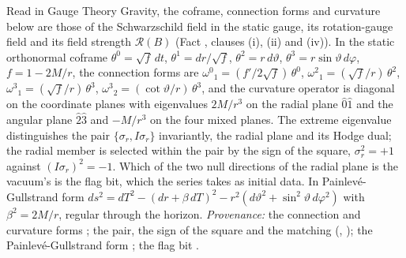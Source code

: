 Read in Gauge Theory Gravity, the coframe, connection forms and curvature below are those of the Schwarzschild field in the static gauge, its rotation-gauge field and its field strength $\mathcal{R}(B)$ (Fact , clauses (i), (ii) and (iv)). In the static orthonormal coframe $\theta^{0} = \sqrt f\,dt$, $\theta^{1} = dr/\sqrt f$, $\theta^{2} = r\,d\vartheta$, $\theta^{3} = r\sin\vartheta\,d\varphi$, $f = 1 - 2M/r$, the connection forms are $\omega^{0}{}_{1} = (f'/2\sqrt f)\,\theta^{0}$, $\omega^{2}{}_{1} = (\sqrt f/r)\,\theta^{2}$, $\omega^{3}{}_{1} = (\sqrt f/r)\,\theta^{3}$, $\omega^{3}{}_{2} = (\cot\vartheta/r)\,\theta^{3}$, and the curvature operator is diagonal on the coordinate planes with eigenvalues $2M/r^{3}$ on the radial plane $\hat0\hat1$ and the angular plane $\hat2\hat3$ and $-M/r^{3}$ on the four mixed planes. The extreme eigenvalue distinguishes the pair $\{\sigma_{r}, I\sigma_{r}\}$ invariantly, the radial plane and its Hodge dual; the radial member is selected within the pair by the sign of the square, $\sigma_{r}^{2} = +1$ against $(I\sigma_{r})^{2} = -1$. Which of the two null directions of the radial plane is the vacuum's is the flag bit, which the series takes as initial data. In Painlev\'e-Gullstrand form $ds^{2} = dT^{2} - (dr + \beta\,dT)^{2} - r^{2}(d\vartheta^{2} + \sin^{2}\vartheta\,d\varphi^{2})$ with $\beta^{2} = 2M/r$, regular through the horizon. \emph{Provenance:} the connection and curvature forms \cite[App.~A.2]{ButlerT5}; the pair, the sign of the square and the matching \cite[Thm.~6.1, Prop.~7.21(3)]{ButlerT5} (, ); the Painlev\'e-Gullstrand form \cite[App.~A.1]{ButlerT5}; the flag bit \cite[Def.~2.10, Prop.~5.1]{ButlerT14}.
